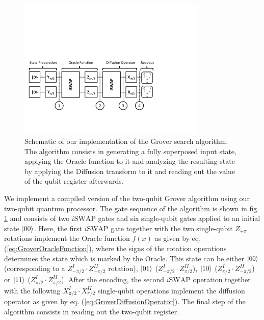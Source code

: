 \begin{figure}[h!]
	\centering
		\includegraphics[width=0.8\textwidth]{./material/papers/grover/grover_algorithm}
	\caption[Schematic of our implementation of the Grover search algorithm]{Schematic of our implementation of the Grover search algorithm. The algorithm consists in generating a fully superposed input state, applying the Oracle function to it and analyzing the resulting state by applying the Diffusion transform to it and reading out the value of the qubit register afterwards.}
	\label{fig:GroverAlgorithmSchematic}
\end{figure}

We implement a compiled version of the two-qubit Grover algorithm using our two-qubit quantum processor. The gate sequence of the algorithm is shown in fig. \ref{fig:GroverAlgorithmSchematic} and consists of two $i\mathrm{SWAP}$ gates and six single-qubit gates applied to an initial state $\left| 00 \right>$. Here, the first $i\mathrm{SWAP}$ gate together with the two single-qubit $Z_{\pm \pi}$ rotations implement the Oracle function $f(x)$ as given by eq. (\ref{eq:GroverOracleFunction}), where the signs of the rotation operations determines the state which is marked by the Oracle. This state can be either $\left| 00 \right>$ (corresponding to a $Z^I_{-\pi/2}\cdot Z^{II}_{-\pi/2}$ rotation), $\left| 01 \right>$ ($Z^I_{-\pi/2}\cdot Z^{II}_{\pi/2}$), $\left| 10 \right>$ ($Z^I_{\pi/2}\cdot Z^{II}_{-\pi/2}$) or $\left| 11 \right>$ ($Z^I_{\pi/2}\cdot Z^{II}_{\pi/2}$). After the encoding, the second $i\mathrm{SWAP}$ operation together with the following $X^I_{\pi/2}\cdot X^{II}_{\pi/2}$ single-qubit operations implement the diffusion operator as given by eq. (\ref{eq:GroverDiffusionOperator}). The final step of the algorithm consists in reading out the two-qubit register.

